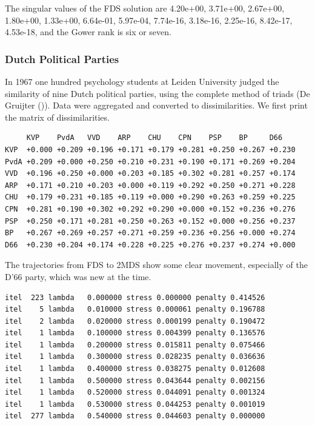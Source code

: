\documentclass[
  12pt,
  letterpaper,
  DIV=11,
  numbers=noendperiod]{scrreprt}
\theoremstyle{remark}
\begin{document}
The singular values of the FDS solution are 4.20e+00, 3.71e+00,
2.67e+00, 1.80e+00, 1.33e+00, 6.64e-01, 5.97e-04, 7.74e-16, 3.18e-16,
2.25e-16, 8.42e-17, 4.53e-18, and the Gower rank is six or seven.

\subsubsection{Dutch Political Parties}\label{dutch-political-parties}

In 1967 one hundred psychology students at Leiden University judged the
similarity of nine Dutch political parties, using the complete method of
triads (De Gruijter ()). Data were
aggregated and converted to dissimilarities. We first print the matrix
of dissimilarities.

\begin{verbatim}
     KVP    PvdA   VVD    ARP    CHU    CPN    PSP    BP     D66   
KVP  +0.000 +0.209 +0.196 +0.171 +0.179 +0.281 +0.250 +0.267 +0.230
PvdA +0.209 +0.000 +0.250 +0.210 +0.231 +0.190 +0.171 +0.269 +0.204
VVD  +0.196 +0.250 +0.000 +0.203 +0.185 +0.302 +0.281 +0.257 +0.174
ARP  +0.171 +0.210 +0.203 +0.000 +0.119 +0.292 +0.250 +0.271 +0.228
CHU  +0.179 +0.231 +0.185 +0.119 +0.000 +0.290 +0.263 +0.259 +0.225
CPN  +0.281 +0.190 +0.302 +0.292 +0.290 +0.000 +0.152 +0.236 +0.276
PSP  +0.250 +0.171 +0.281 +0.250 +0.263 +0.152 +0.000 +0.256 +0.237
BP   +0.267 +0.269 +0.257 +0.271 +0.259 +0.236 +0.256 +0.000 +0.274
D66  +0.230 +0.204 +0.174 +0.228 +0.225 +0.276 +0.237 +0.274 +0.000
\end{verbatim}

The trajectories from FDS to 2MDS show some clear movement, especially
of the D'66 party, which was new at the time.

\begin{verbatim}
itel  223 lambda   0.000000 stress 0.000000 penalty 0.414526 
itel    5 lambda   0.010000 stress 0.000061 penalty 0.196788 
itel    2 lambda   0.020000 stress 0.000199 penalty 0.190472 
itel    1 lambda   0.100000 stress 0.004399 penalty 0.136576 
itel    1 lambda   0.200000 stress 0.015811 penalty 0.075466 
itel    1 lambda   0.300000 stress 0.028235 penalty 0.036636 
itel    1 lambda   0.400000 stress 0.038275 penalty 0.012608 
itel    1 lambda   0.500000 stress 0.043644 penalty 0.002156 
itel    1 lambda   0.520000 stress 0.044091 penalty 0.001324 
itel    1 lambda   0.530000 stress 0.044253 penalty 0.001019 
itel  277 lambda   0.540000 stress 0.044603 penalty 0.000000 
\end{verbatim}
\end{document}
